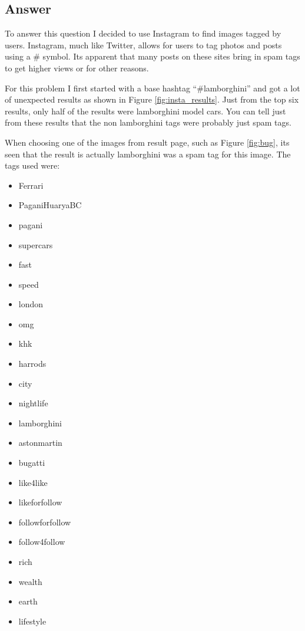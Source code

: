 \documentclass[letterpaper,11pt]{article}
\begin{document}
\subsection*{Answer}

To answer this question I decided to use Instagram to find images tagged by users.
Instagram, much like Twitter, allows for users to tag photos and posts using a \# symbol.
Its apparent that many posts on these sites bring in spam tags to get higher views or for other reasons.

For this problem I first started with a base hashtag ``\#lamborghini'' and got a lot of unexpected results as shown in Figure \ref{fig:insta_results}.
Just from the top six results, only half of the results were lamborghini model cars.
You can tell just from these results that the non lamborghini tags were probably just spam tags.

When choosing one of the images from result page, such as Figure \ref{fig:bug}, its seen that the result is actually lamborghini was a spam tag for this image.
The tags used were:

\begin{itemize}
  \item Ferrari
  \item PaganiHuaryaBC
  \item pagani
  \item supercars
  \item fast
  \item speed
  \item london
  \item omg
  \item khk
  \item harrods
  \item city
  \item nightlife
  \item lamborghini
  \item astonmartin
  \item bugatti
  \item like4like
  \item likeforfollow
  \item followforfollow
  \item follow4follow
  \item rich
  \item wealth
  \item earth
  \item lifestyle
\end{itemize}
\end{document}
